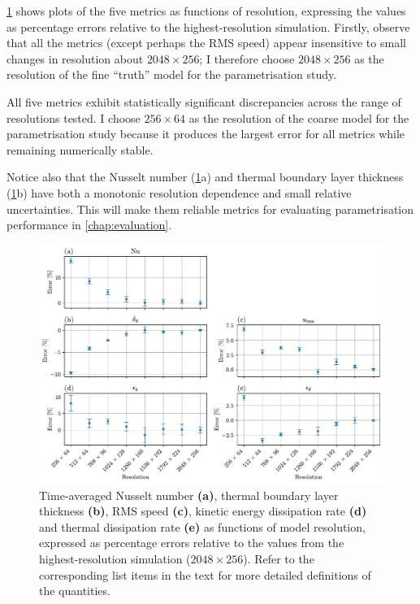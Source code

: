 \documentclass[../main.tex]{subfiles}
\begin{document}
\cref{fig:resolution_dependence} shows plots of the five metrics as functions
of resolution, expressing the values as percentage errors relative to the
highest-resolution simulation. Firstly, observe that all the metrics (except
perhaps the RMS speed) appear insensitive to small changes in resolution about
$2048 \times 256$; I therefore choose $2048 \times 256$ as the resolution of the
fine ``truth'' model for the parametrisation study.

All five metrics exhibit statistically significant discrepancies across the
range of resolutions tested. I choose $256 \times 64$ as the resolution of the
coarse model for the parametrisation study because it produces the largest
error for all metrics while remaining numerically stable.

Notice also that the Nusselt number (\cref{fig:resolution_dependence}a)
and thermal boundary layer thickness (\cref{fig:resolution_dependence}b)
have both a monotonic resolution dependence and small relative uncertainties.
This will make them reliable metrics for evaluating parametrisation
performance in \cref{chap:evaluation}.

\begin{figure}[ht]
    \centering
    \includegraphics[width=\linewidth]{figures/resolution_dependence.pdf}
    \caption{
        Time-averaged Nusselt number \textbf{(a)}, thermal boundary layer
        thickness \textbf{(b)}, RMS speed \textbf{(c)}, kinetic energy
        dissipation rate \textbf{(d)} and thermal dissipation rate \textbf{(e)}
        as functions of model resolution, expressed as percentage errors
        relative to the values from the highest-resolution simulation ($2048
        \times 256$). Refer to the corresponding list items in the text for
        more detailed definitions of the quantities.
    }
    \label{fig:resolution_dependence}
\end{figure}


\ifSubfilesClassLoaded{%
    \emergencystretch=5em
    \printbibliography{}
}{}
\end{document}
